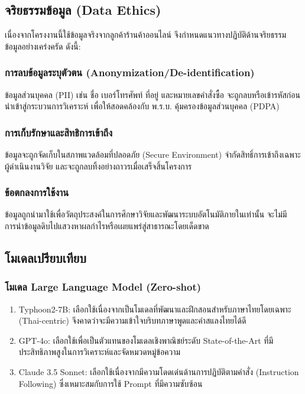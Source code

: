 \subsection{จริยธรรมข้อมูล (Data Ethics)}

เนื่องจากโครงงานนี้ใช้ข้อมูลจริงจากลูกค้าร้านค้าออนไลน์ จึงกำหนดแนวทางปฏิบัติด้านจริยธรรมข้อมูลอย่างเคร่งครัด ดังนี้:

\subsubsection{การลบข้อมูลระบุตัวตน (Anonymization/De-identification)}
ข้อมูลส่วนบุคคล (PII) เช่น ชื่อ เบอร์โทรศัพท์ ที่อยู่ และหมายเลขคำสั่งซื้อ จะถูกลบหรือเข้ารหัสก่อนนำเข้าสู่กระบวนการวิเคราะห์ เพื่อให้สอดคล้องกับ พ.ร.บ. คุ้มครองข้อมูลส่วนบุคคล (PDPA)

\subsubsection{การเก็บรักษาและสิทธิการเข้าถึง}
ข้อมูลจะถูกจัดเก็บในสภาพแวดล้อมที่ปลอดภัย (Secure Environment) จำกัดสิทธิ์การเข้าถึงเฉพาะผู้ดำเนินงานวิจัย และจะถูกลบทิ้งอย่างถาวรเมื่อเสร็จสิ้นโครงการ

\subsubsection{ข้อตกลงการใช้งาน}
ข้อมูลถูกนำมาใช้เพื่อวัตถุประสงค์ในการศึกษาวิจัยและพัฒนาระบบอัตโนมัติภายในเท่านั้น จะไม่มีการนำข้อมูลดิบไปแสวงหาผลกำไรหรือเผยแพร่สู่สาธารณะโดยเด็ดขาด

\subsection{โมเดลเปรียบเทียบ}

\subsubsection{โมเดล Large Language Model (Zero-shot)}
\begin{enumerate}[label=(\arabic*)]
    \item Typhoon2-7B: เลือกใช้เนื่องจากเป็นโมเดลที่พัฒนาและฝึกสอนสำหรับภาษาไทยโดยเฉพาะ (Thai-centric) จึงคาดว่าจะมีความเข้าใจบริบทภาษาพูดและคำสแลงไทยได้ดี
    \item GPT-4o: เลือกใช้เพื่อเป็นตัวแทนของโมเดลเชิงพาณิชย์ระดับ State-of-the-Art ที่มีประสิทธิภาพสูงในการวิเคราะห์และจัดหมวดหมู่ข้อความ
    \item Claude 3.5 Sonnet: เลือกใช้เนื่องจากมีความโดดเด่นด้านการปฏิบัติตามคำสั่ง (Instruction Following) ซึ่งเหมาะสมกับการใช้ Prompt ที่มีความซับซ้อน
\end{enumerate}

